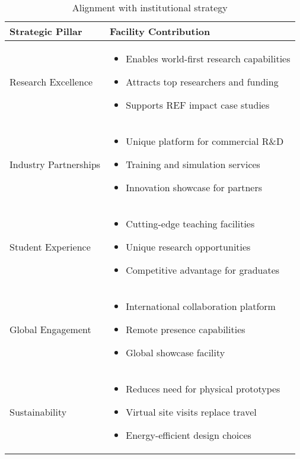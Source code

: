 \begin{table}[H]
\centering
\begin{tabularx}{\textwidth}{lX}
\toprule
\textbf{Strategic Pillar} & \textbf{Facility Contribution} \\
\midrule
\textcolor{dreamlabPrimary}{Research Excellence} &
\begin{itemize}[leftmargin=*, topsep=0pt]
    \item Enables world-first research capabilities
    \item Attracts top researchers and funding
    \item Supports REF impact case studies
\end{itemize} \\
\midrule
\textcolor{dreamlabPrimary}{Industry Partnerships} &
\begin{itemize}[leftmargin=*, topsep=0pt]
    \item Unique platform for commercial R\&D
    \item Training and simulation services
    \item Innovation showcase for partners
\end{itemize} \\
\midrule
\textcolor{dreamlabPrimary}{Student Experience} &
\begin{itemize}[leftmargin=*, topsep=0pt]
    \item Cutting-edge teaching facilities
    \item Unique research opportunities
    \item Competitive advantage for graduates
\end{itemize} \\
\midrule
\textcolor{dreamlabPrimary}{Global Engagement} &
\begin{itemize}[leftmargin=*, topsep=0pt]
    \item International collaboration platform
    \item Remote presence capabilities
    \item Global showcase facility
\end{itemize} \\
\midrule
\textcolor{dreamlabPrimary}{Sustainability} &
\begin{itemize}[leftmargin=*, topsep=0pt]
    \item Reduces need for physical prototypes
    \item Virtual site visits replace travel
    \item Energy-efficient design choices
\end{itemize} \\
\bottomrule
\end{tabularx}
\caption{Alignment with institutional strategy}
\end{table}

